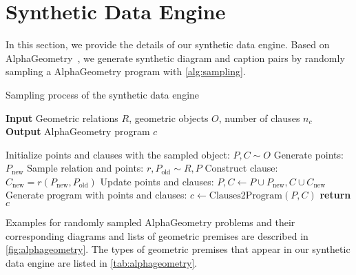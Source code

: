 \section{Synthetic Data Engine}




In this section, we provide the details of our synthetic data engine. Based on AlphaGeometry~\citep{alphageometry}, we generate synthetic diagram and caption pairs by randomly sampling a AlphaGeometry program with \cref{alg:sampling}.

\begin{algorithm}[t!]
\caption{Sampling process of the synthetic data engine}
 \textbf{Input} Geometric relations $R$, geometric objects $O$, number of clauses $n_c$ \\
 \textbf{Output} AlphaGeometry program $c$
\begin{algorithmic}[1]
\State Initialize points and clauses with the sampled object: $P, C \sim O$ 
    \State Generate points: $P_{\text{new}}$
    \State Sample relation and points: $r, P_{\text{old}} \sim R, P$
    \State Construct clause: $C_{\text{new}} = r(P_\text{new}, P_\text{old})$
    \State Update points and clauses: $P, C \gets P \cup P_{\text{new}}, C \cup C_{\text{new}}$
\EndFor
\State Generate program with points and clauses: $c \gets \text{Clauses2Program}(P, C)$
\State \textbf{return} $c$
\end{algorithmic}
\label{alg:sampling}
\end{algorithm}

Examples for randomly sampled AlphaGeometry problems and their corresponding diagrams and lists of geometric premises are described in \cref{fig:alphageometry}.
The types of geometric premises that appear in our synthetic data engine are listed in \cref{tab:alphageometry}.

